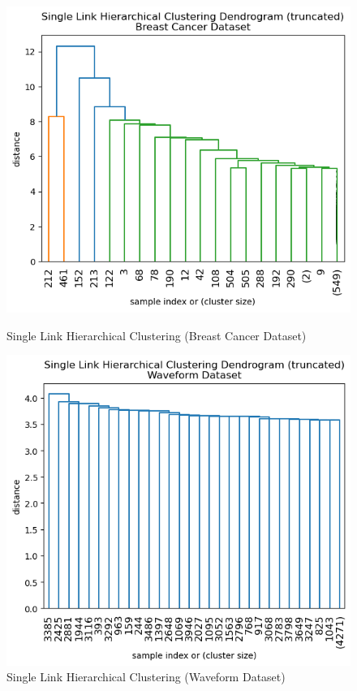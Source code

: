 \documentclass{article}
\begin{document}
\begin{figure}[H]
    \centering
    \begin{minipage}[b]{0.49\textwidth}
        \centering
        \includegraphics[width=\textwidth, height=0.3\textheight]{single_cancer_dend.png}
        \caption{Single Link Hierarchical Clustering (Breast Cancer Dataset)}
    \end{minipage}
    \hfill
    \begin{minipage}[b]{0.49\textwidth}
        \centering
        \includegraphics[width=\textwidth, height=0.3\textheight]{single_waveform_dend.png}
        \caption{Single Link Hierarchical Clustering (Waveform Dataset)}
    \end{minipage}
\end{figure}
\end{document}
